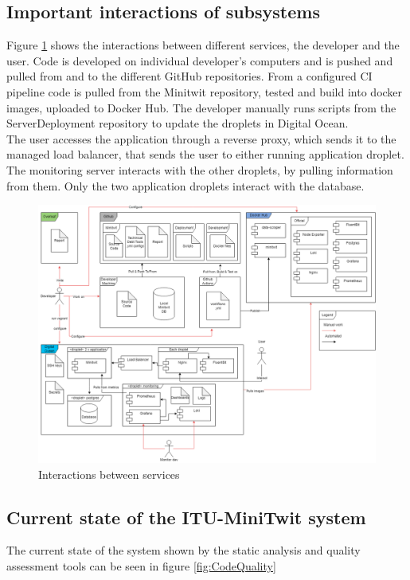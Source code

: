 \subsection{Important interactions of subsystems}
Figure \ref{fig:interactions} shows the interactions between different services, the developer and the user. Code is developed on individual developer's computers and is pushed and pulled from and to the different GitHub repositories. From a configured CI pipeline code is pulled from the Minitwit repository, tested and build into docker images, uploaded to Docker Hub. The developer manually runs scripts from the ServerDeployment repository to update the droplets in Digital Ocean.\\
The user accesses the application through a reverse proxy, which sends it to the managed load balancer, that sends the user to either running application droplet.\\
The monitoring server interacts with the other droplets, by pulling information from them. Only the two application droplets interact with the database.
\begin{figure}[H]
    \centering
    \includegraphics[width=\linewidth]{images/diagrams/Interactions.png}
    \caption{Interactions between services}
    \label{fig:interactions}
\end{figure}


\subsection{Current state of the ITU-MiniTwit system}
The current state of the system shown by the static analysis and quality assessment tools can be seen in figure \ref{fig:CodeQuality}

